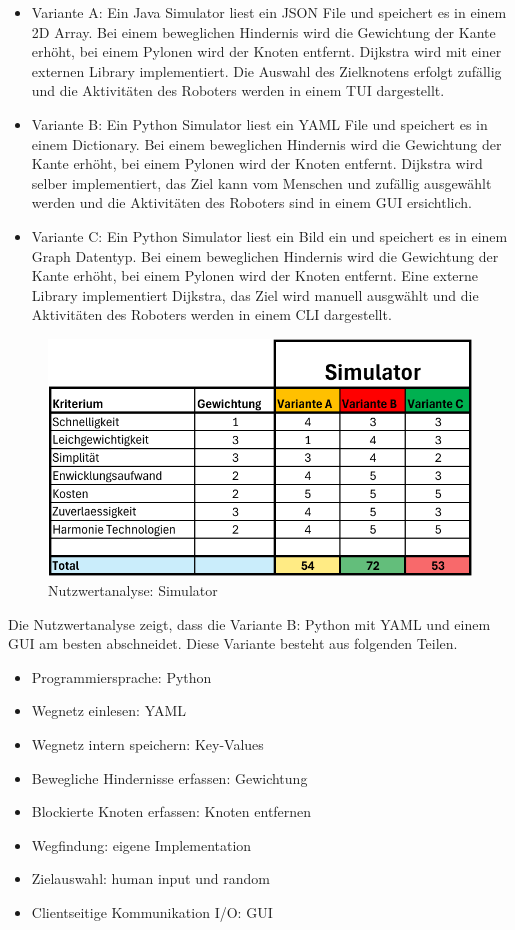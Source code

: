 \begin{itemize}
    \item Variante A: Ein Java Simulator liest ein JSON File und speichert es in einem 2D Array. Bei einem beweglichen Hindernis wird die Gewichtung der Kante erhöht, bei einem Pylonen wird der Knoten entfernt. Dijkstra wird mit einer externen Library implementiert. Die Auswahl des Zielknotens erfolgt zufällig und die Aktivitäten des Roboters werden in einem TUI dargestellt.
    \item Variante B: Ein Python Simulator liest ein YAML File und speichert es in einem Dictionary. Bei einem beweglichen Hindernis wird die Gewichtung der Kante erhöht, bei einem Pylonen wird der Knoten entfernt. Dijkstra wird selber implementiert, das Ziel kann vom Menschen und zufällig ausgewählt werden und die Aktivitäten des Roboters sind in einem GUI ersichtlich.
    \item Variante C: Ein Python Simulator liest ein Bild ein und speichert es in einem Graph Datentyp. Bei einem beweglichen Hindernis wird die Gewichtung der Kante erhöht, bei einem Pylonen wird der Knoten entfernt. Eine externe Library implementiert Dijkstra, das Ziel wird manuell ausgwählt und die Aktivitäten des Roboters werden in einem CLI dargestellt.
\end{itemize}

\begin{figure}[H]
\centering
\includegraphics[width=\textwidth]{assets/Nutzwertanalyse-Simulator.pdf}
\caption{Nutzwertanalyse: Simulator}
\label{fig:nutzwert-Simulator}
\end{figure}

Die Nutzwertanalyse zeigt, dass die Variante B: Python mit YAML und einem GUI am besten abschneidet. Diese Variante besteht aus folgenden Teilen.

\begin{itemize}
    \item Programmiersprache: Python
    \item Wegnetz einlesen: YAML
    \item Wegnetz intern speichern: Key-Values
    \item Bewegliche Hindernisse erfassen: Gewichtung
    \item Blockierte Knoten erfassen: Knoten entfernen
    \item Wegfindung: eigene Implementation
    \item Zielauswahl: human input und random
    \item Clientseitige Kommunikation I/O: GUI
\end{itemize}